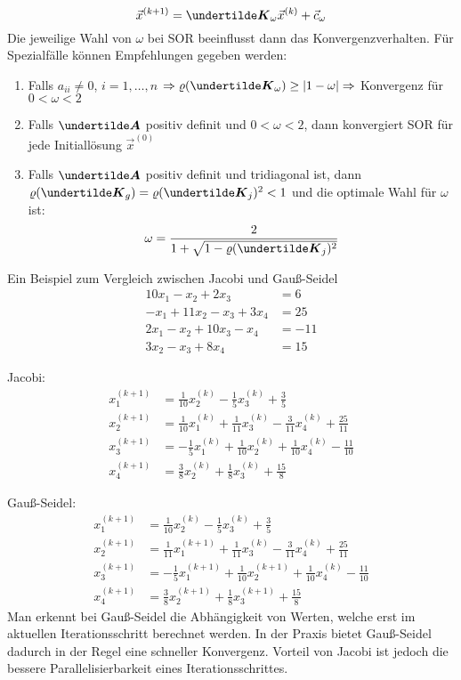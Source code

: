 \begin{enumerate}
	\[\vec{x}^{(k + 1)} = \ma{K}_\omega \vec{x}^{(k)} + \vec{c}_\omega\]
	Die jeweilige Wahl von $\omega$ bei SOR beeinflusst dann das Konvergenzverhalten. Für Spezialfälle können Empfehlungen gegeben werden:
	\begin{enumerate}
		\item Falls $a_{ii} \ne 0$, $i = 1, \dots, n$ $\Rightarrow \varrho(\ma{K}_\omega) \ge |1 - \omega| \Rightarrow$ Konvergenz für $0 < \omega < 2$
		\item Falls $\ma{A}$ positiv definit und $0 < \omega < 2$, dann konvergiert SOR für jede Initiallösung $\vec{x}^{(0)}$
		\item Falls $\ma{A}$ positiv definit und tridiagonal ist, dann $\varrho(\ma{K}_g) = \varrho(\ma{K}_j)^2 < 1$ und die optimale Wahl für $\omega$ ist:
		\[\omega = \frac{2}{1 + \sqrt{1 - \varrho(\ma{K}_j)^2}}\]
	\end{enumerate}
\end{enumerate}
Ein Beispiel zum Vergleich zwischen Jacobi und Gauß-Seidel
\begin{align*}
10 x_1 - x_2 + 2 x_3 &= 6 \\
- x_1 + 11 x_2 - x_3 + 3 x_4 &= 25 \\
2 x_1 - x_2 + 10 x_3 - x_4 &= -11 \\
3 x_2 - x_3 + 8 x_4 &= 15
\end{align*}

Jacobi:
\begin{align*}
	x_1^{(k + 1)} &= \frac{1}{10} x_2^{(k)} - \frac{1}{5} x_3^{(k)} + \frac{3}{5} \\
	x_2^{(k + 1)} &= \frac{1}{10} x_1^{(k)} + \frac{1}{11} x_3^{(k)} - \frac{3}{11} x_4^{(k)} + \frac{25}{11} \\
	x_3^{(k + 1)} &=  -\frac{1}{5} x_1^{(k)} + \frac{1}{10} x_2^{(k)} + \frac{1}{10} x_4^{(k)} - \frac{11}{10} \\
	x_4^{(k + 1)} &= \frac{3}{8} x_2^{(k)} + \frac{1}{8} x_3^{(k)} + \frac{15}{8}
\end{align*}

Gauß-Seidel:
\begin{align*}
x_1^{(k + 1)} &= \frac{1}{10} x_2^{(k)} - \frac{1}{5} x_3^{(k)} + \frac{3}{5} \\
x_2^{(k + 1)} &= \frac{1}{11} x_1^{(k + 1)} + \frac{1}{11} x_3^{(k)} - \frac{3}{11} x_4^{(k)} + \frac{25}{11} \\
x_3^{(k + 1)} &= -\frac{1}{5} x_1^{(k + 1)} + \frac{1}{10} x_2^{(k + 1)} + \frac{1}{10} x_4^{(k)} - \frac{11}{10} \\
x_4^{(k + 1)} &= \frac{3}{8} x_2^{(k + 1)} + \frac{1}{8} x_3^{(k + 1)} + \frac{15}{8}
\end{align*}
Man erkennt bei Gauß-Seidel die Abhängigkeit von Werten, welche erst im aktuellen Iterationsschritt berechnet werden. In der Praxis bietet Gauß-Seidel dadurch in der Regel eine schneller Konvergenz. Vorteil von Jacobi ist jedoch die bessere Parallelisierbarkeit eines Iterationsschrittes.

